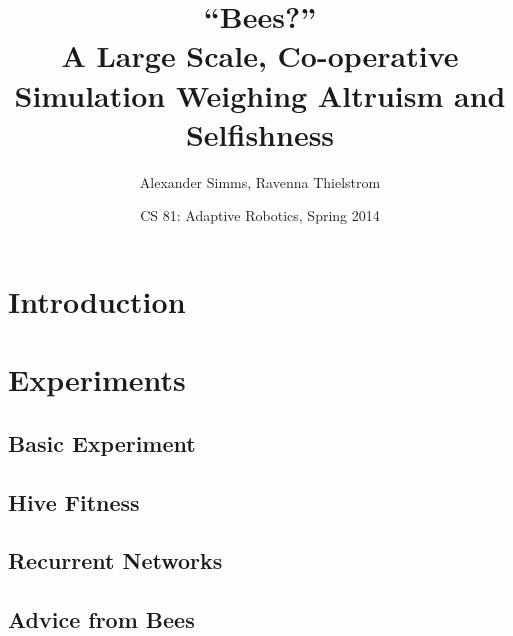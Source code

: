 \documentclass{article}
\title  {``Bees?''\\ A Large Scale, Co-operative Simulation 
         Weighing Altruism and Selfishness}
\author {Alexander Simms, Ravenna Thielstrom}
\date   {CS 81: Adaptive Robotics, Spring 2014}
\begin{document}
	\maketitle

	\begin{abstract}
		\lipsum[1]
	\end{abstract}

	\section{Introduction} %
	\label{sec:introduction}
		\lipsum[3-8]

	\section{Experiments} %
	\label{sec:experiments}
		\subsection{Basic Experiment} %
		\label{sub:basic_experiment}
		\lipsum[8-10]

		\subsection{Hive Fitness} %
		\label{sub:hive_fitness}
		\lipsum[10-12]

		\subsection{Recurrent Networks} %
		\label{sub:recurrent_networks}
		\lipsum[12-14]

		\subsection{Advice from Bees} %
		\label{sub:advice_from_bees}
		
\end{document}
